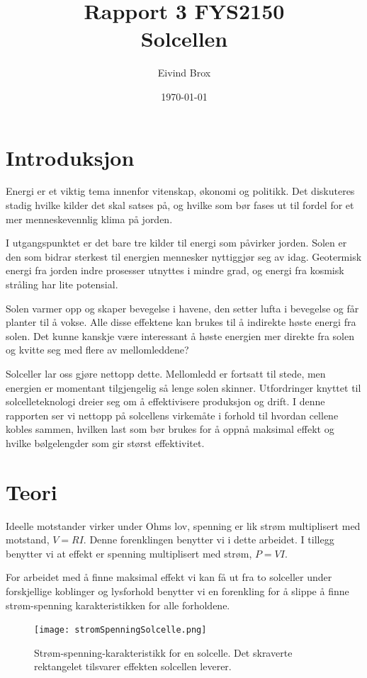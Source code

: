 \documentclass[a4paper,11pt, twocolumn]{article}
\title{Rapport 3 FYS2150\\Solcellen}
\author{Eivind Brox}
\date{\today}
\begin{document}
\maketitle
\listoftodos
\begin{abstract}

\end{abstract}

\section{Introduksjon}
Energi er et viktig tema innenfor vitenskap, økonomi og politikk. Det diskuteres stadig hvilke kilder det skal satses på, og hvilke som bør fases ut til fordel for et mer menneskevennlig klima på jorden. 

I utgangspunktet er det bare tre kilder til energi som påvirker jorden. Solen er den som bidrar sterkest til energien mennesker nyttiggjør seg av idag. Geotermisk energi fra jorden indre prosesser utnyttes i mindre grad, og energi fra kosmisk stråling har lite potensial.

Solen varmer opp og skaper bevegelse i havene, den setter lufta i bevegelse og får planter til å vokse. Alle disse effektene kan brukes til å indirekte høste energi fra solen. Det kunne kanskje være interessant å høste energien mer direkte fra solen og kvitte seg med flere av mellomleddene?

Solceller lar oss gjøre nettopp dette. Mellomledd er fortsatt til stede, men energien er momentant tilgjengelig så lenge solen skinner. Utfordringer knyttet til solcelleteknologi dreier seg om å effektivisere produksjon og drift. I denne rapporten ser vi nettopp på solcellens virkemåte i forhold til hvordan cellene kobles sammen, hvilken last som bør brukes for å oppnå maksimal effekt og hvilke bølgelengder som gir størst effektivitet.   
\section{Teori}
Ideelle motstander virker under Ohms lov, spenning er lik strøm multiplisert med motstand, $V=RI$. Denne forenklingen benytter vi i dette arbeidet. I tillegg benytter vi at effekt er spenning multiplisert med strøm, $P = VI$.

For arbeidet med å finne maksimal effekt vi kan få ut fra to solceller under forskjellige koblinger og lysforhold benytter vi en forenkling for å slippe å finne strøm-spenning karakteristikken for alle forholdene.

\begin{figure}[!ht]
	\texttt{[image: stromSpenningSolcelle.png]}
	\caption{Strøm-spenning-karakteristikk for en solcelle. Det skraverte rektangelet tilsvarer effekten solcellen leverer.}
	\label{fig:powerCurrentVoltage}
\end{figure}
\end{document}
